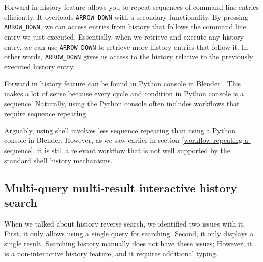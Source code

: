 Forward in history feature allows you to repeat sequences of command line entries efficiently. It overloads \verb|ARROW_DOWN| with a secondary functionality. 
By pressing \verb|ARROW_DOWN|, we can access entries from history that follows the command line entry we just executed. Essentially, when we retrieve and execute any history entry, we can use \verb|ARROW_DOWN| to retrieve more history entries that follow it. In other words, \verb|ARROW_DOWN| gives us access to the history relative to the previously executed history entry.






Forward in history feature can be found in Python console in Blender \cite{tools-blender-docs-python-console}. This makes a lot of sense because every cycle and condition in Python console is a sequence. Naturally, using the Python console often includes workflows that require sequence repeating.

Arguably, using shell involves less sequence repeating than using a Python console in Blender. However, as we saw earlier in section \ref{workflow-repeating-a-sequence}, it is still a relevant workflow that is not well supported by the standard shell history mechanisms. 

\subsection{Multi-query multi-result interactive history search}

When we talked about history reverse search, we identified two issues with it. First, it only allows using a single query for searching. Second, it only displays a single result.
Searching history manually does not have these issues; However, it is a non-interactive history feature, and it requires additional typing. 

